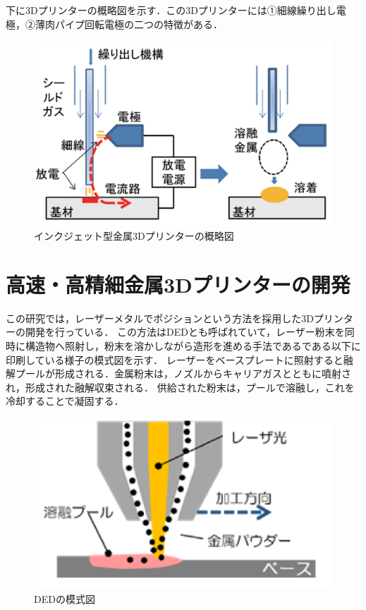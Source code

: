 下に3Dプリンターの概略図を示す．この3Dプリンターには①細線繰り出し電極，②薄肉パイプ回転電極の二つの特徴がある．

\begin{figure}[H]
  \centering
  \includegraphics[width=10truecm]{./fig/houdenn.png}
  \caption{インクジェット型金属3Dプリンターの概略図}
  \label{fig:ferret}
\end{figure}



\section{高速・高精細金属3Dプリンターの開発\cite{k}}
\label{sec:enum}
この研究では，レーザーメタルでポジションという方法を採用した3Dプリンターの開発を行っている．
この方法はDEDとも呼ばれていて，レーザー粉末を同時に構造物へ照射し，粉末を溶かしながら造形を進める手法であるである以下に印刷している様子の模式図を示す．
レーザーをベースプレートに照射すると融解プールが形成される．金属粉末は，ノズルからキャリアガスとともに噴射され，形成された融解収束される．
供給された粉末は，プールで溶融し，これを冷却することで凝固する．

\begin{figure}[H]
  \centering
  \includegraphics[width=9truecm]{./fig/kinnzoku.png}
  \caption{DEDの模式図}
  \label{fig:ferret}
\end{figure}

